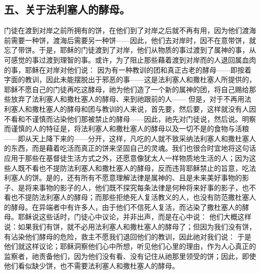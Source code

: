 
\subsection{五、关于法利塞人的酵母。}

 门徒在渡到对岸之前所拥有的饼，在他们到了对岸之后就不再有用，因为他们渡海前需要一种饼，渡海后需要另一种饼——因此，他们去对岸时，因不在意带饼，就忘了带饼。于是，耶稣的门徒渡到了对岸，他们从物质的事过渡到了属神的事，从可感觉的事过渡到理智的事。或许，为了阻止那些藉着渡到对岸而的人退回属血肉的事，耶稣在对岸对他们说： 因为有一种教训的团和真正古老的酵母——即按着字面的教训，因此未能摆脱出于邪恶的事——这是法利塞人和撒杜塞人所提供的，耶稣不愿自己的门徒再吃这酵母，祂为他们造了一个新的属神的团，将自己赐给那些放弃了法利塞人和撒杜塞人的酵母、来到祂跟前的人—— 但是，对于不再用法利塞人和撒杜塞人的酵母和团与教训的人来说，首先要，然后要，这样就没有人因不看和不谨慎而沾染他们那被禁止的酵母——因此，祂先对门徒说，然后说。明察而谨慎的人的特征是，将法利塞人和撒杜塞人的酵母以及一切不是的食物与活粮——即从天上降下来的——分开，这样，凡吃的人就不致采纳法利塞人和撒杜塞人的东西，而是藉着吃活而真正的饼来坚固自己的灵魂。我们也很合时宜地将这句话应用于那些在基督徒生活方式之外，还愿意像犹太人一样物质地生活的人；因为这些人既不看也不提防法利塞人和撒杜塞人的酵母，反而违背耶稣禁止的旨意，吃法利塞人的饼。是的，还有所有不愿意理解法律是属神的、且是未来美好事物的影子、是将来事物的影子的人，他们既不探究每条法律是何种将来好事的影子，也不看也不提防法利塞人的酵母；而那些拒绝死人复活教义的人，也没有防范撒杜塞人的酵母。在异端者中有许多人，由于他们不信死人复活，而沾染了撒杜塞人的酵母。耶稣说这些话时，门徒心中议论，并非出声，而是在心中说： 他们大概这样说：如果我们有饼，就不必用法利塞人和撒杜塞人的酵母了；但因为我们没有饼，有沾染他们酵母的危险，救主不愿我们退回他们的教训，因此祂对我们说： 于是他们就这样议论；耶稣洞察他们心中所想，听见他们心里的理由，作为人心真正的监察者，祂责备他们，因为他们没有看、没有记住从祂那里领受的饼；因此，即使他们看似缺少饼，也不需要法利塞人和撒杜塞人的酵母。\par

